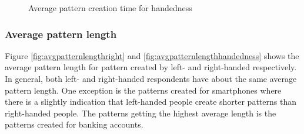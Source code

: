       \begin{figure}[H]
        \centering
        \caption{Average pattern creation time for handedness}
        \label{fig:avgcreationtimehandedness}
      \end{figure}

    \subsubsection{Average pattern length}
      Figure \ref{fig:avgpatternlengthright} and \ref{fig:avgpatternlengthhandedness} shows the average pattern length for pattern created by left- and right-handed respectively. In general, both left- and right-handed respondents have about the same average pattern length. One exception is the patterns created for smartphones where there is a slightly indication that left-handed people create shorter patterns than right-handed people. The patterns getting the highest average length is the patterns created for banking accounts. 

